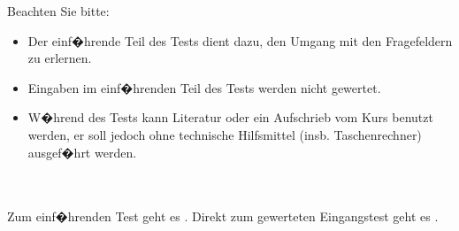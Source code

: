 



\Mtikzexternalize




\begin{MSectionStart}
\MGlobalSTestTag
{}


Beachten Sie bitte:

\begin{itemize}
\item{Der einf�hrende Teil des Tests dient dazu, den Umgang mit den Fragefeldern zu erlernen.}
\item{Eingaben im einf�hrenden Teil des Tests werden nicht gewertet.}
\item{W�hrend des Tests kann Literatur oder ein Aufschrieb vom Kurs benutzt werden, er soll jedoch ohne technische Hilfsmittel (insb. Taschenrechner) ausgef�hrt werden.}
\end{itemize}

\ \\ \ \\
Zum einf�hrenden Test geht es .
Direkt zum gewerteten Eingangstest geht es .

\end{MSectionStart}

